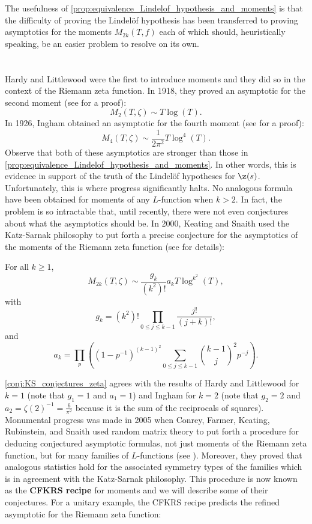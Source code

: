   The usefulness of \cref{prop:equivalence_Lindelof_hypothesis_and_moments} is that the difficulty of proving the Lindel\"of hypothesis has been transferred to proving asymptotics for the moments $M_{2k}(T,f)$ each of which should, heuristically speaking, be an easier problem to resolve on its own.
\section{}
  Hardy and Littlewood were the first to introduce moments and they did so in the context of the Riemann zeta function. In 1918, they proved an asymptotic for the second moment (see \cite{hardy1916contributions} for a proof):
  \[
    M_{2}(T,\zeta) \sim T\log(T).
  \]
  In 1926, Ingham obtained an asymptotic for the fourth moment (see \cite{ingham1928mean} for a proof):
  \[
    M_{4}(T,\zeta) \sim \frac{1}{2\pi^{2}}T\log^{4}(T).
  \]
  Observe that both of these asymptotics are stronger than those in \cref{prop:equivalence_Lindelof_hypothesis_and_moments}. In other words, this is evidence in support of the truth of the Lindel\"of hypotheses for $\z(s)$. Unfortunately, this is where progress significantly halts. No analogous formula have been obtained for moments of any $L$-function when $k > 2$. In fact, the problem is so intractable that, until recently, there were not even conjectures about what the asymptotics should be. In 2000, Keating and Snaith used the Katz-Sarnak philosophy to put forth a precise conjecture for the asymptotics of the moments of the Riemann zeta function (see \cite{keating2000random} for details):

  \begin{conjecture}\label{conj:KS_conjectures_zeta}
    For all $k \ge 1$,
    \[
      M_{2k}(T,\zeta) \sim \frac{g_{k}}{(k^{2})!}a_{k}T\log^{k^{2}}(T),
    \]
    with
    \[
      g_{k} = (k^{2})!\prod_{0 \le j \le k-1}\frac{j!}{(j+k)!},
    \]
    and
    \[
      a_{k} = \prod_{p}\left((1-p^{-1})^{(k-1)^{2}}\sum_{0 \le j \le k-1}\binom{k-1}{j}^{2}p^{-j}\right).
    \]
  \end{conjecture}
  
  \cref{conj:KS_conjectures_zeta} agrees with the results of Hardy and Littlewood for $k = 1$ (note that $g_{1} = 1$ and $a_{1} = 1$) and Ingham for $k = 2$ (note that $g_{2} = 2$ and $a_{2} = \zeta(2)^{-1} = \frac{6}{\pi^{2}}$ because it is the sum of the reciprocals of squares). Monumental progress was made in 2005 when Conrey, Farmer, Keating, Rubinstein, and Snaith used random matrix theory to put forth a procedure for deducing conjectured asymptotic formulas, not just moments of the Riemann zeta function, but for many families of $L$-functions (see \cite{conrey2005integral}). Moreover, they proved that analogous statistics hold for the associated symmetry types of the families which is in agreement with the Katz-Sarnak philosophy. This procedure is now known as the \textbf{CFKRS recipe} for moments and we will describe some of their conjectures. For a unitary example, the CFKRS recipe predicts the refined asymptotic for the Riemann zeta function:

